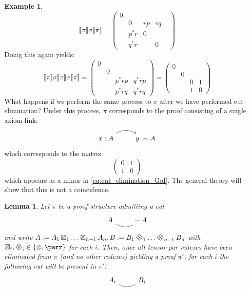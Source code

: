 \documentclass[12pt]{article}
\theoremstyle{plain}
\newtheorem{lemma}[thm]{Lemma}
\theoremstyle{definition}
\newtheorem{example}[thm]{Example}
\newcommand{\negation}{\sim}
\DeclareRobustCommand{\diamondtimes}{%
  \mathbin{\text{\rotatebox[origin=c]{45}{$\boxplus$}}}%
}
\begin{document}
\begin{example}
\begin{equation}
\llbracket \pi \rrbracket \sigma \llbracket \pi \rrbracket =
\begin{pmatrix}
0&&&\\
&0&r p &r q &\\
& p^\ast r &0&\\
& q^\ast r &&0
\end{pmatrix}
\end{equation}
Doing this again yields:
\begin{equation}\label{eq:cut_elimination_GoI}
\llbracket \pi \rrbracket \sigma \llbracket \pi \rrbracket \sigma \llbracket \pi \rrbracket = 
\begin{pmatrix}
0&&&\\
&0&&\\
&& p^\ast r p & q^\ast r p\\
&& p^\ast r q & q^\ast r q
\end{pmatrix}
=
\begin{pmatrix}
0&&&\\
&0&&\\
&& 0 & 1\\
&& 1 & 0
\end{pmatrix}
\end{equation}
What happens if we perform the same process to $\pi$ after we have performed cut-elimination? Under this process, $\pi$ corresponds to the proof consisting of a single axiom link:
\begin{equation}
\begin{tikzcd}
x:A\arrow[r,bend left,] & y:\negation A
\end{tikzcd}
\end{equation}
which corresponds to the matrix
\begin{equation}
\begin{pmatrix}
0 & 1\\
1 & 0
\end{pmatrix}
\end{equation}
which appears as a minor in \eqref{eq:cut_elimination_GoI}. The general theory will show that this is not a coincidence.
\end{example}
\begin{lemma}\label{lem:cut_order_preservation}
Let $\pi$ be a proof-structure admitting a cut
\begin{equation}
\begin{tikzcd}
A\arrow[r,dash,bend right] & \negation A
\end{tikzcd}
\end{equation}
and write $A := A_1 \boxtimes_1 \hdots \boxtimes_{n-1} A_n, B := B_1 \diamondtimes_1 \hdots \diamondtimes_{n-1} B_n$ with $\boxtimes_i, \diamondtimes_i \in \lbrace \otimes, \parr\rbrace$ for each $i$. Then, once all tensor-par redexes have been eliminated from $\pi$ (and no other redexes) yielding a proof $\pi'$, for each $i$ the following cut will be present in $\pi'$:
\begin{equation}
\begin{tikzcd}
A_i\arrow[r,dash,bend right] & B_i
\end{tikzcd}
\end{equation}
\end{lemma}
\end{document}
